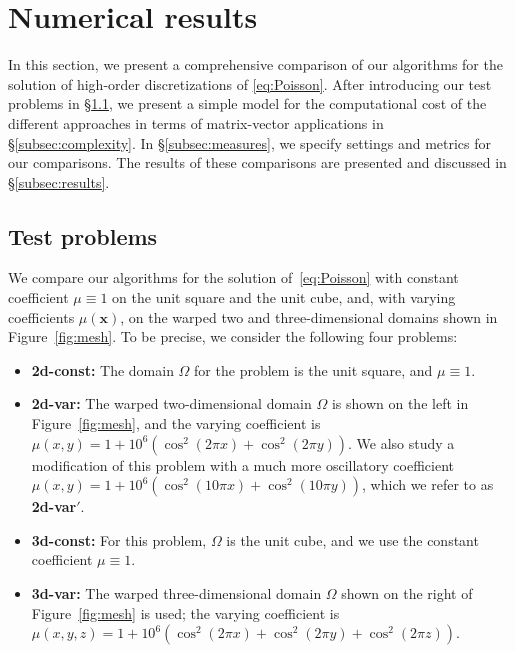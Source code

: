 \documentclass[smallcondensed,final]{svjour3}     %
\newcommand{\bs}[1]{\ensuremath{\boldsymbol #1}}
\begin{document}
\section{Numerical results}\label{sec:numerics}
In this section, we present a comprehensive comparison of our
algorithms for the solution of high-order discretizations of
\eqref{eq:Poisson}.  After introducing our test problems in
\S\ref{subsec:tests}, we present a simple model for the computational
cost of the different approaches in terms of matrix-vector
applications in \S\ref{subsec:complexity}. In \S\ref{subsec:measures},
we specify settings and metrics for our comparisons. The results of
these comparisons are presented and discussed in
\S\ref{subsec:results}.


\subsection{Test problems}\label{subsec:tests}
We compare our algorithms for the solution of~\eqref{eq:Poisson} with
constant coefficient $\mu\equiv 1$ on the unit square and the unit cube,
and, with varying coefficients $\mu(\bs x)$, on the warped two and
three-dimensional domains shown in Figure~\ref{fig:mesh}. To be
precise, we consider the following four problems:
\begin{itemize}
\item {\bf 2d-const:} The domain $\Omega$ for the problem is the unit square, and $\mu\equiv
  1$.
\item {\bf 2d-var:} The warped two-dimensional domain $\Omega$ is
  shown on the left in Figure~\ref{fig:mesh}, and the varying
  coefficient is $\mu(x,y) = 1 + 10^6(\cos^2(2\pi x) + \cos^2(2\pi
  y))$. We also study a modification of this problem with a much more
  oscillatory coefficient
  $\mu(x,y) = 1 + 10^6(\cos^2(10\pi x) +
  \cos^2(10\pi y))$, which we refer to as {\bf 2d-var$'$}.
\item {\bf 3d-const:} For this problem, $\Omega$ is the unit cube,
  and we use the constant coefficient $\mu\equiv 1$.
\item {\bf 3d-var:} The warped three-dimensional domain $\Omega$
  shown on the right of Figure~\ref{fig:mesh} is used; the
  varying coefficient is $\mu(x,y,z) = 1 + 10^6(\cos^2(2\pi x) +
  \cos^2(2\pi y) + \cos^2(2\pi z))$.
\end{itemize}
\end{document}
